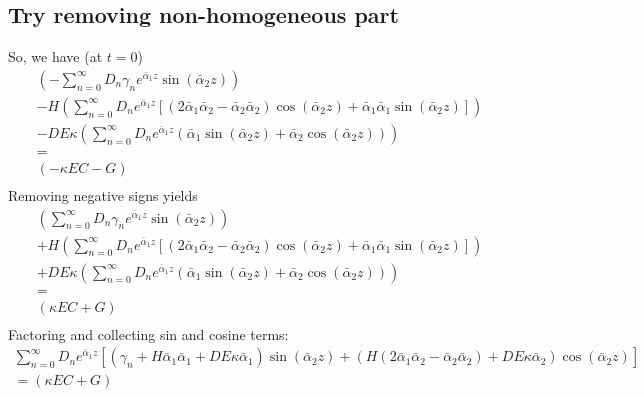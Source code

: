 \documentclass[11pt]{article}
\newcommand{\ABA}{\bar{\alpha}_1}
\newcommand{\ABB}{\bar{\alpha}_2}
\begin{document}
\subsection{Try removing non-homogeneous part}
So, we have (at $t=0$)
\begin{equation}\begin{aligned}
	\left( - \sum_{n=0}^{\infty} D_n \gamma_n e^{\ABA z} \sin(\ABB z) \right) \\
	 - H \left( \sum_{n=0}^{\infty} D_n e^{\ABA z} \left[ (2 \ABA \ABB - \ABB \ABB) \cos (\ABB z) + \ABA \ABA \sin (\ABB z) \right] \right) \\
	 - DE \kappa \left( \sum_{n=0}^{\infty} D_n e^{\ABA z} ( \ABA \sin (\ABB z) + \ABB \cos (\ABB z) ) \right) \\
	  = \\
	  (- \kappa EC -G) \\
\end{aligned} \end{equation}
Removing negative signs yields
\begin{equation}\begin{aligned}
	\left( \sum_{n=0}^{\infty} D_n \gamma_n e^{\ABA z} \sin(\ABB z) \right) \\
	 + H \left( \sum_{n=0}^{\infty} D_n e^{\ABA z} \left[ (2 \ABA \ABB - \ABB \ABB) \cos (\ABB z) + \ABA \ABA \sin (\ABB z) \right] \right) \\
	 + DE \kappa \left( \sum_{n=0}^{\infty} D_n e^{\ABA z} ( \ABA \sin (\ABB z) + \ABB \cos (\ABB z) ) \right) \\
	  = \\
	  (\kappa EC +G) \\
\end{aligned} \end{equation}
Factoring and collecting sin and cosine terms:
\begin{equation}\begin{aligned}
	 \sum_{n=0}^{\infty} D_n e^{\ABA z} \left[ (\gamma_n + H \ABA \ABA + DE \kappa \ABA) \sin(\ABB z) + (H(2 \ABA \ABB - \ABB \ABB) + DE\kappa \ABB ) \cos (\ABB z) \right] \\ = (\kappa EC + G) \\
\end{aligned} \end{equation}
\end{document}
